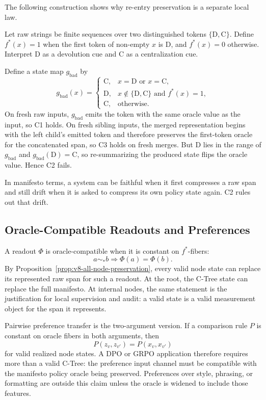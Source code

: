 The following construction shows why re-entry preservation is a separate
local law.

\begin{example}
\label{ex:v8-c2-independent}
Let raw strings be finite sequences over two distinguished tokens
\(\{\mathrm{D},\mathrm{C}\}\). Define \(f^\ast(x)=1\) when the first token of
non-empty \(x\) is \(\mathrm{D}\), and \(f^\ast(x)=0\) otherwise. Interpret
\(\mathrm{D}\) as a devolution cue and \(\mathrm{C}\) as a centralization cue.

Define a state map \(g_{\mathrm{bad}}\) by
\[
g_{\mathrm{bad}}(x)=
\begin{cases}
\mathrm{C}, & x=\mathrm{D}\text{ or }x=\mathrm{C},\\
\mathrm{D}, & x\notin\{\mathrm{D},\mathrm{C}\}\text{ and }f^\ast(x)=1,\\
\mathrm{C}, & \text{otherwise.}
\end{cases}
\]
On fresh raw inputs, \(g_{\mathrm{bad}}\) emits the token with the same oracle
value as the input, so C1 holds. On fresh sibling inputs, the merged
representation begins with the left child's emitted token and therefore
preserves the first-token oracle for the concatenated span, so C3 holds on
fresh merges. But \(\mathrm{D}\) lies in the range of \(g_{\mathrm{bad}}\) and
\(g_{\mathrm{bad}}(\mathrm{D})=\mathrm{C}\), so re-summarizing the produced
state flips the oracle value. Hence C2 fails.
\end{example}

In manifesto terms, a system can be faithful when it first compresses a raw
span and still drift when it is asked to compress its own policy state again.
C2 rules out that drift.

\subsection{Oracle-Compatible Readouts and Preferences}

A readout \(\Phi\) is oracle-compatible when it is constant on
\(f^\ast\)-fibers:
\[
  a\sim_\ast b \Rightarrow \Phi(a)=\Phi(b).
\]
By Proposition~\ref{prop:v8-all-node-preservation}, every valid node state can
replace its represented raw span for such a readout. At the root, the C-Tree
state can replace the full manifesto. At internal nodes, the same statement is
the justification for local supervision and audit: a valid state is a valid
measurement object for the span it represents.

Pairwise preference transfer is the two-argument version. If a comparison rule
\(P\) is constant on oracle fibers in both arguments, then
\[
  P(z_v,z_{v'})=P(x_v,x_{v'})
\]
for valid realized node states. A DPO or GRPO application therefore requires
more than a valid C-Tree: the preference input channel must be compatible with
the manifesto policy oracle being preserved. Preferences over style, phrasing,
or formatting are outside this claim unless the oracle is widened to include
those features.

